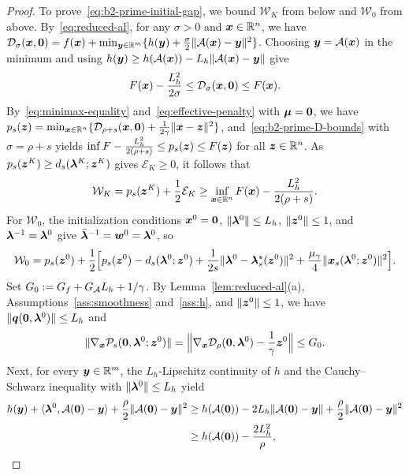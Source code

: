 \begin{proof}
To prove~\eqref{eq:b2-prime-initial-gap}, we bound \(\mathcal W_K\) from below
and \(\mathcal W_0\) from above. By~\eqref{eq:reduced-al}, for
any \(\sigma>0\) and \(\bm{x}\in\mathbb{R}^n\), we have
\(\mathcal{D}_\sigma(\bm{x},\bm{0})=f(\bm{x})+\min_{\bm{y}\in\mathbb{R}^m}\{h(\bm{y})
+\frac{\sigma}{2}\|\mathcal{A}(\bm{x})-\bm{y}\|^2\}\). Choosing \(\bm{y}=\mathcal{A}(\bm{x})\) in the minimum and using
\(h(\bm{y})\ge h(\mathcal{A}(\bm{x}))-L_h\|\mathcal{A}(\bm{x})-\bm{y}\|\) give
\begin{equation}
    F(\bm{x})-\frac{L_h^2}{2\sigma}\le\mathcal{D}_\sigma(\bm{x},\bm{0})\le F(\bm{x}).
    \label{eq:b2-prime-D-bounds}
\end{equation}
By~\eqref{eq:minimax-equality} and~\eqref{eq:effective-penalty} with
\(\bm{\mu}=\bm{0}\), we have
\(p_s(\bm{z})=\min_{\bm{x}\in\mathbb{R}^n}\{\mathcal{D}_{\rho+s}(\bm{x},\bm{0})
+\frac{1}{2\gamma}\|\bm{x}-\bm{z}\|^2\}\), and~\eqref{eq:b2-prime-D-bounds} with
\(\sigma=\rho+s\) yields
\(\inf F-\frac{L_h^2}{2(\rho+s)}\le p_s(\bm{z})\le F(\bm{z})\) for all
\(\bm{z}\in\mathbb{R}^n\). As \(p_s(\bm{z}^K)\ge d_s(\bm{\lambda}^K;\bm{z}^K)\) gives \(\mathcal E_K\ge0\), it
follows that
\begin{equation}
    \mathcal W_K=p_s(\bm{z}^K)+\frac12\mathcal E_K
    \ge\inf_{\bm{x}\in\mathbb{R}^n}F(\bm{x})-\frac{L_h^2}{2(\rho+s)} .
    \label{eq:b2-prime-WK-lower}
\end{equation}
For \(\mathcal W_0\), the initialization conditions \(\bm{x}^0=\bm{0}\),
\(\|\bm{\lambda}^0\|\le L_h\), \(\|\bm{z}^0\|\le1\), and \(\bm{\lambda}^{-1}=\bm{\lambda}^0\) give
\(\bar{\bm{\lambda}}^{-1}=\bm{w}^0=\bm{\lambda}^0\), so
\begin{equation}
    \mathcal W_0=p_s(\bm{z}^0)+\frac12\Bigl[
    p_s(\bm{z}^0)-d_s(\bm{\lambda}^0;\bm{z}^0)
    +\frac{1}{2s}\|\bm{\lambda}^0-\bm{\lambda}_s^\star(\bm{z}^0)\|^2
    +\frac{\mu_\gamma}{4}\|\bm{x}_s(\bm{\lambda}^0;\bm{z}^0)\|^2\Bigr].
    \label{eq:b2-prime-W0}
\end{equation}
Set \(G_0:=G_f+G_{\mathcal{A}}L_h+1/\gamma\). By Lemma~\ref{lem:reduced-al}(a),
Assumptions~\ref{ass:smoothness} and~\ref{ass:h}, and \(\|\bm{z}^0\|\le1\), we
have \(\|\bm{q}(\bm{0},\bm{\lambda}^0)\|\le L_h\) and
\[
    \|\nabla_{\bm{x}}\mathcal P_s(\bm{0},\bm{\lambda}^0;\bm{z}^0)\|
    =\Bigl\|\nabla_{\bm{x}}\mathcal{D}_\rho(\bm{0},\bm{\lambda}^0)-\frac{1}{\gamma}\bm{z}^0\Bigr\|
    \le G_0.
\]
Next, for every \(\bm{y}\in\mathbb{R}^m\), the \(L_h\)-Lipschitz continuity of \(h\) and
the Cauchy--Schwarz inequality with \(\|\bm{\lambda}^0\|\le L_h\) yield
\begin{align*}
    h(\by)+\langle\blmbd^0,\calA(\zero)-\by\rangle
    +\frac{\rho}{2}\|\calA(\zero)-\by\|^2
    &\ge h(\calA(\zero))-2L_h\|\calA(\zero)-\by\|
    +\frac{\rho}{2}\|\calA(\zero)-\by\|^2\\
    &\ge h(\calA(\zero))-\frac{2L_h^2}{\rho},

\end{align*}
\end{proof}

